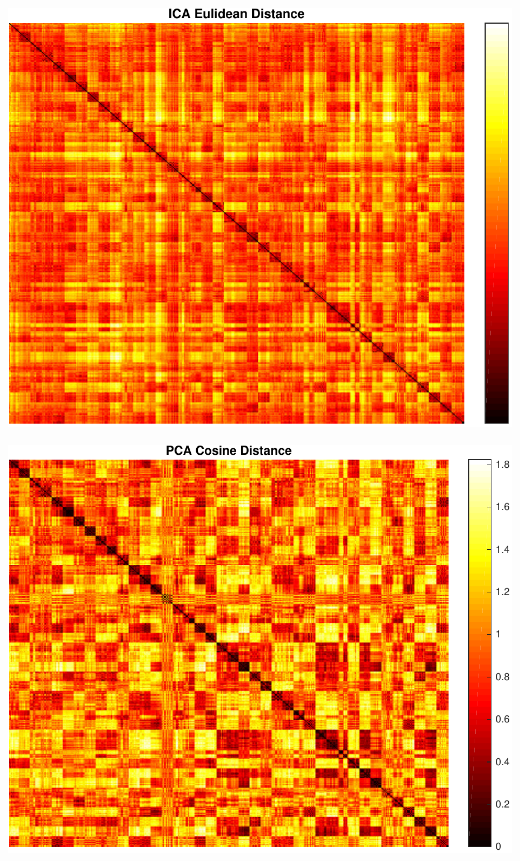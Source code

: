 \begin{center}
\begin{minipage}[t]{\linewidth}
\center
{
\includegraphics[width=\MyFactor\textwidth]{Img/icaeu} 
}
\end{minipage}
\medskip
\end{center}


\begin{center}
\begin{minipage}[t]{\linewidth}
\center
{
\includegraphics[width=\MyFactor\textwidth]{Img/pcacos} 
}
\end{minipage}
\medskip
\end{center}

